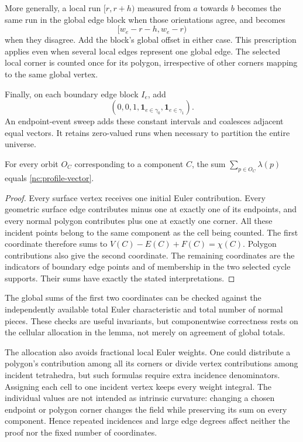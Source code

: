 More generally, a local run $[r,r+h)$ measured from $a$ towards
$b$ becomes the same run in the global edge block when those
orientations agree, and becomes
\[
 [w_e-r-h,w_e-r)
\]
when they disagree.  Add the block's global offset in either case.
This prescription applies even when several local edges represent
one global edge.  The selected local corner is counted once for
its polygon, irrespective of other corners mapping to the same
global vertex.

Finally, on each boundary edge block $I_e$, add
\[
 (0,0,1,\mathbf 1_{e\in\gamma_0},\mathbf 1_{e\in\gamma_1}).
\]
An endpoint-event sweep adds these constant intervals and coalesces
adjacent equal vectors.  It retains zero-valued runs when necessary
to partition the entire universe.

\begin{lemma}\label{nc:cellular-weights}
For every orbit $O_C$ corresponding to a component $C$, the sum
$\sum_{p\in O_C}\lambda(p)$ equals
\eqref{nc:profile-vector}.
\end{lemma}
\begin{proof}
Every surface vertex receives one initial Euler contribution.
Every geometric surface edge contributes minus one at exactly one
of its endpoints, and every normal polygon contributes plus one
at exactly one corner.  All these incident points belong to the
same component as the cell being counted.  The first coordinate
therefore sums to $V(C)-E(C)+F(C)=\chi(C)$.  Polygon contributions
also give the second coordinate.  The remaining coordinates are
the indicators of boundary edge points and of membership in the
two selected cycle supports.  Their sums have exactly the stated
interpretations.
\end{proof}

The global sums of the first two coordinates can be checked
against the independently available total Euler characteristic
and total number of normal pieces.  These checks are useful
invariants, but componentwise correctness rests on the cellular
allocation in the lemma, not merely on agreement of global totals.

The allocation also avoids fractional local Euler weights.  One
could distribute a polygon's contribution among all its corners
or divide vertex contributions among incident tetrahedra, but
such formulas require extra incidence denominators.  Assigning
each cell to one incident vertex keeps every weight integral.
The individual values are not intended as intrinsic curvature:
changing a chosen endpoint or polygon corner changes the field
while preserving its sum on every component.  Hence repeated
incidences and large edge degrees affect neither the proof nor
the fixed number of coordinates.

